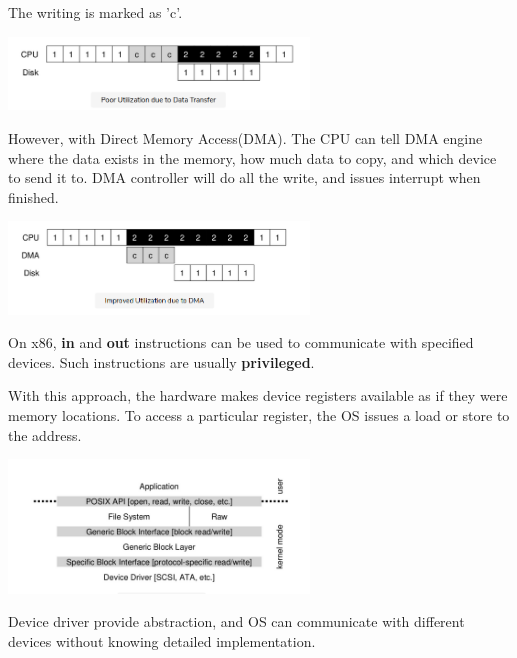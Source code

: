         The writing is marked as 'c'.
        
        \includegraphics[width=0.6\textwidth]{chapters/Persistence/persistence/poor_write_to_disk.png}


        However, with Direct Memory Access(DMA). The CPU can tell DMA engine where the data exists 
        in the memory, how much data to copy, and which device to send it to. DMA controller will do
        all the write, and issues interrupt when finished.

        \includegraphics[width=0.6\textwidth]{chapters/Persistence/persistence/improved_by_DMA.png}


        On x86, \textbf{in} and \textbf{out} instructions can be used to communicate with 
        specified devices.
        Such instructions are usually \textbf{privileged}.


        With this approach, the hardware makes device registers available as if they were memory 
        locations. To access a particular register, the OS issues a load or store to the address.


        \includegraphics[width=0.6\textwidth]{chapters/Persistence/persistence/Linux_software_organization.png}

        Device driver provide abstraction, and OS can communicate with different devices without 
        knowing detailed implementation.


